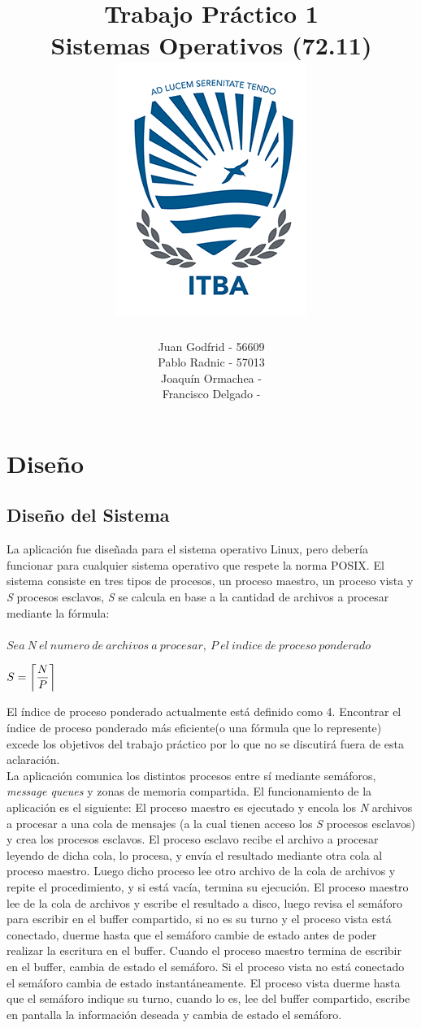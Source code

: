 \documentclass[10pt,a4paper]{report}
\title{
	\bf\color{darkcerulean} Trabajo Práctico 1 \\
	\color{black}Sistemas Operativos (72.11) \\
	\includegraphics{itba-escudo2}
	}
\author{Juan Godfrid - 56609 \\Pablo Radnic - 57013 \\ Joaquín Ormachea - \\Francisco Delgado -}
\DeclarePairedDelimiter{\ceil}{\lceil}{\rceil}
\begin{document}
\maketitle

\newpage
\tableofcontents
\newpage


\chapter{Diseño}
\section{Diseño del Sistema}
La aplicación fue diseñada para el sistema operativo Linux, pero debería funcionar para cualquier sistema operativo que respete la norma POSIX. El sistema consiste en tres tipos de procesos, un proceso maestro, un proceso vista y \textit{S} procesos esclavos, \textit{S} se calcula en base a la cantidad de archivos a procesar mediante la fórmula:
\\\\ $Sea\ N\ el\ numero\ de\ archivos\ a\ procesar,\ P\ el\ indice\ de\ proceso\ ponderado\,$
 \begin{center}
  $S = \ceil*{\dfrac{N}{P}}$\\
 \end{center}
\indent El índice de proceso ponderado actualmente está definido como 4. Encontrar el índice de proceso ponderado más eficiente(o una fórmula que lo represente) excede los objetivos del trabajo práctico por lo que no se discutirá fuera de esta aclaración. 
\\ \indent La aplicación comunica los distintos procesos entre sí mediante semáforos, \textit{message queues} y zonas de memoria compartida. El funcionamiento de la aplicación es el siguiente:
El proceso maestro es ejecutado y encola los \textit{N} archivos a procesar a una cola de mensajes (a la cual tienen acceso los \textit{S} procesos esclavos) y crea los procesos esclavos. El proceso esclavo recibe el archivo a procesar leyendo de dicha cola, lo procesa, y envía el resultado mediante otra cola al proceso maestro. Luego dicho proceso lee otro archivo de la cola de archivos y repite el procedimiento, y si está vacía, termina su ejecución. El proceso maestro lee de la cola de archivos y escribe el resultado a disco, luego revisa el semáforo para escribir en el buffer compartido, si no es su turno y el proceso vista está conectado, duerme hasta que el semáforo cambie de estado antes de poder realizar la escritura en el buffer. Cuando el proceso maestro termina de escribir en el buffer, cambia de estado el semáforo. Si el proceso vista no está conectado el semáforo cambia de estado instantáneamente. El proceso vista duerme hasta que el semáforo indique su turno, cuando lo es, lee del buffer compartido, escribe en pantalla la información deseada y cambia de estado el semáforo. 
\end{document}

